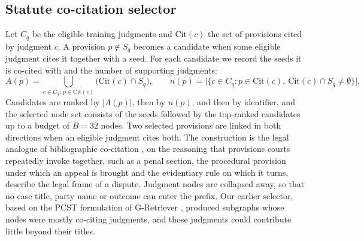 \documentclass[11pt,a4paper]{article}
\begin{document}
\subsection{Statute co-citation selector}
Let $C_q$ be the eligible training judgments and $\mathrm{Cit}(c)$ the set of provisions cited by judgment $c$. A provision $p\notin S_q$ becomes a candidate when some eligible judgment cites it together with a seed. For each candidate we record the seeds it is co-cited with and the number of supporting judgments:
\begin{equation}
A(p)=\bigcup_{c\in C_q:\,p\in\mathrm{Cit}(c)}\bigl(\mathrm{Cit}(c)\cap S_q\bigr),\qquad
n(p)=\bigl|\{c\in C_q:p\in\mathrm{Cit}(c),\ \mathrm{Cit}(c)\cap S_q\neq\emptyset\}\bigr|.
\end{equation}
Candidates are ranked by $|A(p)|$, then by $n(p)$, and then by identifier, and the selected node set consists of the seeds followed by the top-ranked candidates up to a budget of $B=32$ nodes. Two selected provisions are linked in both directions when an eligible judgment cites both. The construction is the legal analogue of bibliographic co-citation \cite{r31}, on the reasoning that provisions courts repeatedly invoke together, such as a penal section, the procedural provision under which an appeal is brought and the evidentiary rule on which it turns, describe the legal frame of a dispute. Judgment nodes are collapsed away, so that no case title, party name or outcome can enter the prefix. Our earlier selector, based on the PCST formulation of G-Retriever \cite{r23,r55}, produced subgraphs whose nodes were mostly co-citing judgments, and those judgments could contribute little beyond their titles.
\end{document}
